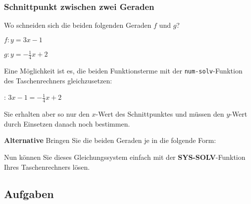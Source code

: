 \subsubsection{Schnittpunkt zwischen zwei Geraden}

Wo schneiden sich die beiden folgenden Geraden $f$ und $g$?

$f: y=3x - 1$

$g: y=-\frac14x +2$

Eine Möglichkeit ist es, die beiden Funktionsterme mit
der \texttt{num-solv}-Funktion des Taschenrechners gleichzusetzen:

: $3x-1 = -\frac14x+2$

Sie erhalten aber so nur den $x$-Wert des Schnittpunktes und müssen
den $y$-Wert durch Einsetzen danach noch bestimmen.


\textbf{Alternative}
Bringen Sie die beiden Geraden je in die folgende Form:


Nun können Sie dieses Gleichungssystem einfach mit
der \textbf{SYS-SOLV}-Funktion Ihres Taschenrechners lösen.

\vspace{5mm}


\vspace{5mm}

\newpage

\subsection*{Aufgaben}

\newpage
